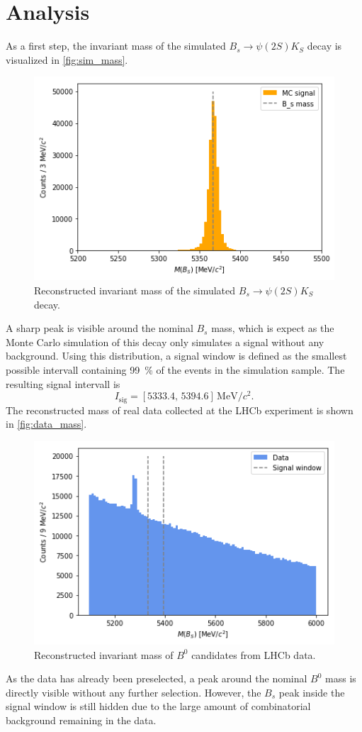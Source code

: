 \section{Analysis}
\label{sec:Analysis}

As a first step, the invariant mass of the simulated $B_s \to \psi(2S)K_S$ decay is visualized in \autoref{fig:sim_mass}.
\begin{figure}[H]
	\centering
	\includegraphics[width=0.5\linewidth]{plots/simulation_mass.png}
	\caption{Reconstructed invariant mass of the simulated $B_s \to \psi(2S)K_S$ decay.}
	\label{fig:sim_mass}
\end{figure}
A sharp peak is visible around the nominal $B_s$ mass, which is expect as the Monte Carlo simulation of this decay only simulates a signal without any background.
Using this distribution, a signal window is defined as the smallest possible intervall containing \qty{99}{\percent} of the events in the simulation sample.
The resulting signal intervall is
\begin{equation*}
    I_\text{sig} = [5333.4, \, 5394.6] \, \si{\mega\electronvolt\per c^2}.
\end{equation*}
The reconstructed mass of real data collected at the LHCb experiment is shown in \autoref{fig:data_mass}.
\begin{figure}[H]
	\centering
	\includegraphics[width=0.5\linewidth]{plots/signal_window.png}
	\caption{Reconstructed invariant mass of $B^0$ candidates from LHCb data.}
	\label{fig:data_mass}
\end{figure}
As the data has already been preselected, a peak around the nominal $B^0$ mass is directly visible without any further selection. However, the $B_s$ peak inside the signal window
is still hidden due to the large amount of combinatorial background remaining in the data.

